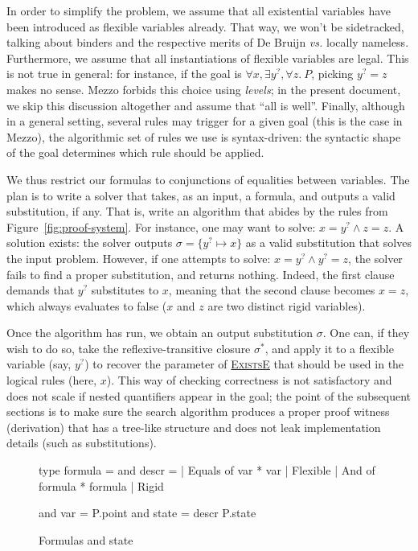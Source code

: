 \documentclass{easychair}
\let\TirName\textsc
\renewcommand{\DefTirName}[1]{\hyperlink{#1}{\TirName {#1}}}
\let\Rule\DefTirName
\newcommand{\fref}[1]{Figure~\ref{fig:#1}}
\newcommand{\f}[1]{\ensuremath{#1^?}} %
\begin{document}
In order to simplify the problem, we assume that all existential variables have
been introduced as flexible variables already. That way, we won't be
sidetracked, talking about binders and the respective merits of De Bruijn
\emph{vs.} locally nameless. Furthermore, we assume that all instantiations of
flexible variables are legal. This is not true in general: for instance, if the
goal is $\forall x, \exists \f y, \forall z.\ P$, picking $\f y = z$ makes no
sense. Mezzo forbids this choice using \emph{levels}; in the present document,
we skip this discussion altogether and assume that ``all is well''. Finally,
although in a general setting, several rules may trigger for a given goal (this
is the case in Mezzo), the algorithmic set of rules we use is syntax-driven: the
syntactic shape of the goal determines which rule should be applied.

We thus restrict our formulas to conjunctions of equalities between variables.
The plan is to write a solver that takes,
as an input, a formula, and outputs a valid substitution, if any. That is,
write an algorithm that abides by the rules from \fref{proof-system}.
For instance, one may want to solve: $x = \f y \wedge z = z$.
A solution exists: the solver outputs $\sigma = \{ \f y \mapsto x \}$ as a valid
substitution that solves the input problem. However, if one attempts to solve:
$x = \f y \wedge \f y = z$, the solver fails to find a
proper substitution, and returns nothing. Indeed, the first clause demands that
$\f y$ substitutes to $x$, meaning that the second clause becomes $x = z$, which
always evaluates to false ($x$ and $z$ are two distinct rigid variables).

Once the algorithm has run, we obtain an output substitution $\sigma$. One can, if they
wish to do so, take the reflexive-transitive closure $\sigma^*$, and apply it to
a flexible variable (say, $\f y$) to recover the parameter of \Rule{ExistsE}
that should be used in the logical rules (here, $x$). This way of checking
correctness is not satisfactory and does not scale if nested quantifiers appear
in the goal; the point of the subsequent sections is to make sure the search
algorithm produces a proper proof witness (derivation) that has a tree-like
structure and does not leak implementation details (such as substitutions).

\begin{figure}
  \centering
  \begin{ocaml}
type formula =                and descr =
| Equals of var * var           | Flexible
| And of formula * formula      | Rigid

and var = P.point             and state = descr P.state
  \end{ocaml}
  \caption{Formulas and state}
  \label{fig:formulas}
\end{figure}
\end{document}
